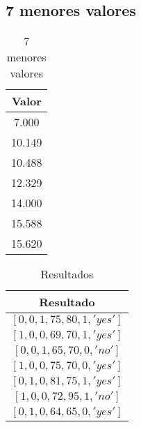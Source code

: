 \subsection {7 menores valores} \label{subsec:7 menores valores}

\begin{table}[htbp]
    \centering
    \caption{7 menores valores}
    \label{tab:siete_menores_valores}
    \begin{tabular}{|c|}
    \hline
    \textbf{Valor} \\
    \hline
    7.000 \\
    10.149 \\
    10.488 \\
    12.329 \\
    14.000 \\
    15.588 \\
    15.620 \\
    \hline
    \end{tabular}
\end{table}

\begin{table}[htbp]
    \centering
    \caption{Resultados}
    \label{tab:k7_resultados}
    \begin{tabular}{|c|}
    \hline
    \textbf{Resultado} \\
    \hline
    $[0, 0, 1, 75, 80, 1, 'yes']$ \\
    $[1, 0, 0, 69, 70, 1, 'yes']$ \\
    $[0, 0, 1, 65, 70, 0, 'no']$ \\
    $[1, 0, 0, 75, 70, 0, 'yes']$ \\
    $[0, 1, 0, 81, 75, 1, 'yes']$ \\
    $[1, 0, 0, 72, 95, 1, 'no']$ \\
    $[0, 1, 0, 64, 65, 0, 'yes']$ \\
    \hline
    \end{tabular}
\end{table}
